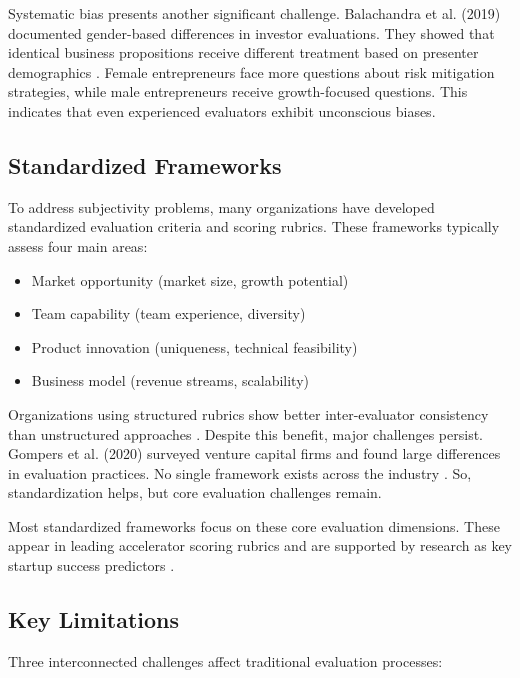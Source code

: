 Systematic bias presents another significant challenge. Balachandra et al. (2019) documented gender-based differences in investor evaluations. They showed that identical business propositions receive different treatment based on presenter demographics \cite{Balachandra2019}. Female entrepreneurs face more questions about risk mitigation strategies, while male entrepreneurs receive growth-focused questions. This indicates that even experienced evaluators exhibit unconscious biases.

\subsection{Standardized Frameworks}\label{subsec:standardized-frameworks}
To address subjectivity problems, many organizations have developed standardized evaluation criteria and scoring rubrics. These frameworks typically assess four main areas:
\begin{itemize}
    \item Market opportunity (market size, growth potential)
    \item Team capability (team experience, diversity)
    \item Product innovation (uniqueness, technical feasibility)
    \item Business model (revenue streams, scalability)
\end{itemize}

Organizations using structured rubrics show better inter-evaluator consistency than unstructured approaches \cite{Tsay2021VISUALSDI}. Despite this benefit, major challenges persist. Gompers et al. (2020) surveyed venture capital firms and found large differences in evaluation practices. No single framework exists across the industry \cite{Gompers2020}. So, standardization helps, but core evaluation challenges remain.

Most standardized frameworks focus on these core evaluation dimensions. These appear in leading accelerator scoring rubrics and are supported by research as key startup success predictors \cite{Kalvapalle2024}.

\subsection{Key Limitations}\label{subsec:key-limitations}
Three interconnected challenges affect traditional evaluation processes:

